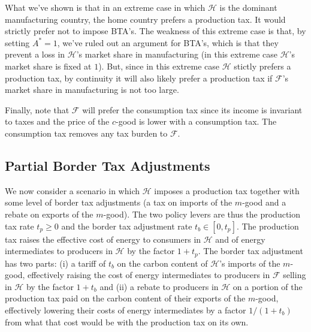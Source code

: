 \documentclass[notitlepage,12pt]{article}
\begin{document}
What we've shown is that in an extreme case in which $\mathcal{H}$ is the
dominant manufacturing country, the home country prefers a production tax.
It would strictly prefer not to impose BTA's. The weakness of this extreme
case is that, by setting $A^{\ast }=1$, we've ruled out an argument for
BTA's, which is that they prevent a loss in $\mathcal{H}$'s market share in
manufacturing (in this extreme case $\mathcal{H}$'s market share is fixed at 
$1$). But, since in this extreme case $\mathcal{H}$ stictly prefers a
production tax, by continuity it will also likely prefer a production tax if 
$\mathcal{F}$'s market share in manufacturing is not too large.

Finally, note that $\mathcal{F}$ will prefer the consumption tax since its
income is invariant to taxes and the price of the $c$-good is lower with a
consumption tax. The consumption tax removes any tax burden to $\mathcal{F}$.

\subsection{Partial Border Tax Adjustments}

We now consider a scenario in which $\mathcal{H}$ imposes a production tax
together with some level of border tax adjustments (a tax on imports of the $%
m$-good and a rebate on exports of the $m$-good). The two policy levers are
thus the production tax rate $t_{p}\geq 0$ and the border tax adjustment
rate $t_{b}\in \left[ 0,t_{p}\right] $. The production tax raises the
effective cost of energy to consumers in $\mathcal{H}$ and of energy
intermediates to producers in $\mathcal{H}$ by the factor $1+t_{p}$. The
border tax adjustment has two parts: (i) a tariff of $t_{b}$ on the carbon
content of $\mathcal{H}$'s imports of the $m$-good, effectively raising the
cost of energy intermediates to producers in $\mathcal{F}$ selling in $%
\mathcal{H}$ by the factor $1+t_{b}$ and (ii) a rebate to producers in $%
\mathcal{H}$ on a portion of the production tax paid on the carbon content
of their exports of the $m$-good, effectively lowering their costs of energy
intermediates by a factor $1/(1+t_{b})$ from what that cost would be with
the production tax on its own.
\end{document}
